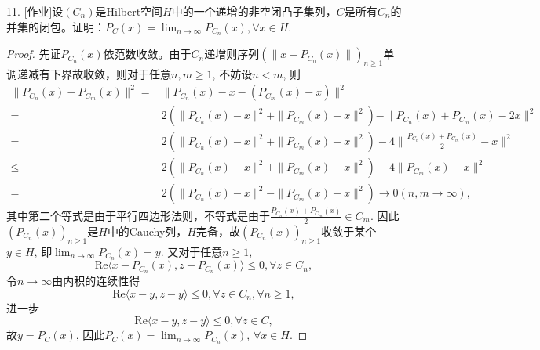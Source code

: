 \documentclass[a4paper,8pt]{ctexart}\textwidth 140mm \textheight 216mm
\newcommand{\8}{\infty}
\newcommand{\la}{\langle}
\newcommand{\ra}{\rangle}
\begin{document}
11. [作业]设$(C_n)$是Hilbert空间$H$中的一个递增的非空闭凸子集列，$C$是所有$C_n$的并集的闭包。证明：$P_C(x)=\lim_{n\to\infty}P_{C_n}(x),\forall x\in H$.
\begin{proof}
	先证$P_{C_n}(x)$依范数收敛。由于$C_n$递增则序列$(\|x-P_{C_n}(x)\|)_{n\geq 1}$单调递减有下界故收敛，则对于任意$n,m\geq 1$, 不妨设$n<m$, 则
	\begin{equation*}
	\begin{split}
	\|P_{C_n}(x)-P_{C_m}(x)\|^2=&\|P_{C_n}(x)-x-(P_{C_m}(x)-x)\|^2\\
	=&2(\|P_{C_n}(x)-x\|^2+\|P_{C_m}(x)-x\|^2)-\|P_{C_n}(x)+P_{C_m}(x)-2x\|^2\\
	=&2(\|P_{C_n}(x)-x\|^2+\|P_{C_m}(x)-x\|^2)-4\|\frac{P_{C_n}(x)+P_{C_m}(x)}{2}-x\|^2\\
	\leq &2(\|P_{C_n}(x)-x\|^2+\|P_{C_m}(x)-x\|^2)-4\|P_{C_m}(x)-x\|^2\\
	=&2(\|P_{C_n}(x)-x\|^2-\|P_{C_m}(x)-x\|^2)\to 0(n,m\to\infty),
	\end{split}
	\end{equation*}
	其中第二个等式是由于平行四边形法则，不等式是由于$\frac{P_{C_n}(x)+P_{C_m}(x)}{2}\in C_m$. 因此$(P_{C_n}(x))_{n\geq 1}$是$H$中的Cauchy列，$H$完备，故$(P_{C_n}(x))_{n\geq 1}$收敛于某个$y\in H$, 即$\lim_{n\to \infty}P_{C_n}(x)=y$. 又对于任意$n\geq 1$, 
	\begin{equation*}
	\mathrm{Re}\la x-P_{C_n}(x),z-P_{C_n}(x)\ra\leq 0, \forall z\in C_n,
	\end{equation*}
	令$n\to\infty$由内积的连续性得
	$$\mathrm{Re}\la x-y,z-y\ra\leq 0,\forall z\in C_n,\forall n\geq 1,$$
	进一步
	$$\mathrm{Re}\la x-y,z-y\ra\leq 0,\forall z\in C,$$
	故$y=P_C(x)$, 因此$P_C(x)=\lim_{n\to\infty}P_{C_n}(x)$, $\forall x\in H$.
\end{proof}
\end{document}
